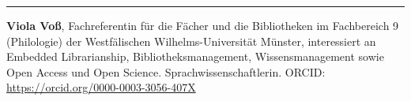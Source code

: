 \begin{center}\rule{0.5\linewidth}{\linethickness}\end{center}

\textbf{Viola Voß}, Fachreferentin für die Fächer und die Bibliotheken
im Fachbereich 9 (Philologie) der Westfälischen Wilhelms-Universität
Münster, interessiert an Embedded Librarianship, Bibliotheksmanagement,
Wissensmanagement sowie Open Access und Open Science.
Sprachwissenschaftlerin. ORCID:
\url{https://orcid.org/0000-0003-3056-407X}
